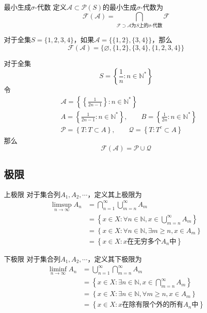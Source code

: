 \documentclass[lang = cn, scheme = chinese, thmcnt = section]{elegantbook}
\newcommand{\N}{\mathbb{N}}            %
\newcommand{\sub}{\subset}             %
\begin{document}
\begin{definition}{最小生成$\sigma$-代数}
	定义$\mathscr{A}\sub\mathscr{P}(S)$的最小生成$\sigma$-代数为%
	$$
	\mathscr{F}(\mathscr{A})=\bigcap_{\mathscr{F}\supset\mathscr{A}\text{为}S\text{上的}\sigma\text{-代数}}{\mathscr{F}}
	$$
\end{definition}

\begin{example}
	对于全集$S=\{ 1,2,3,4 \}$，如果$\mathscr{A}=\{ \{ 1,2 \},\{ 3,4 \} \}$，那么
	$$
	\mathscr{F}(\mathscr{A})=\{ \varnothing,\{ 1,2 \},\{ 3,4 \},\{ 1,2,3,4 \} \}
	$$
\end{example}

\begin{example}
	对于全集
	$$
	S=\left\{ \frac{1}{n}:n\in\N^* \right\}
	$$
	令
	\begin{align*}
		& \mathscr{A}=\left\{ \left\{ \frac{1}{2n-1} \right\}:n\in\N^* \right\}\\
		& A=\left\{ \frac{1}{2n-1}:n\in\N^* \right\},\qquad B=\left\{ \frac{1}{2n}:n\in\N^* \right\}\\
		& \mathscr{P}=\left\{ T:T\sub A \right\},\qquad \mathscr{Q}=\left\{ T:T^c\sub A \right\}
	\end{align*}
	那么
	$$
	\mathscr{F}(\mathscr{A})=\mathscr{P}\cup\mathscr{Q}
	$$
\end{example}

\subsection{极限}

\begin{definition}{上极限}
	对于集合列$A_1,A_2,\cdots$，定义其上极限为
	\begin{align*}
		\limsup_{n\to\infty}{A_n}
		&=\bigcap_{n=1}^{\infty}{\bigcup_{m=n}^{\infty}{A_m}}\\
		&=\left\{x\in X:\forall n\in\N,x\in\bigcup_{m=n}^{\infty}{A_m}\right\}\\
		&=\left\{x\in X:\forall n\in\N,\exists m\ge n,x\in A_m\right\}\\
		&=\left\{x\in X:x\text{在无穷多个}A_n\text{中}\right\}
	\end{align*}
\end{definition}

\begin{definition}{下极限}
	对于集合列$A_1,A_2,\cdots$，定义其下极限为
	\begin{align*}
		\liminf_{n\to\infty}{A_n}
		&=\bigcup_{n=1}^{\infty}{\bigcap_{m=n}^{\infty}{A_m}}\\
		&=\left\{x\in X:\exists n\in\N,x\in\bigcap_{m=n}^{\infty}{A_m}\right\}\\
		&=\left\{x\in X:\exists n\in\N,\forall m\ge n,x\in A_m\right\}\\
		&=\left\{x\in X:x\text{在除有限个外的所有}A_n\text{中}\right\}
	\end{align*}
\end{definition}
\end{document}
